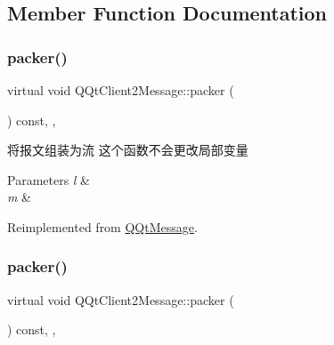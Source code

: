 \subsection{Member Function Documentation}
\mbox{\label{class_q_qt_client2_message_a64b7eaf964f8f2a2ef2c10088fb7e60a}} 
\subsubsection{\texorpdfstring{packer()}{packer()}\hspace{0.1cm}{\footnotesize\ttfamily [1/2]}}
{\footnotesize\ttfamily virtual void Q\+Qt\+Client2\+Message\+::packer (\begin{DoxyParamCaption}\item[{Q\+Byte\+Array \&}]{ }\end{DoxyParamCaption}) const\hspace{0.3cm}{\ttfamily [inline]}, {\ttfamily [override]}, {\ttfamily [virtual]}}



将报文组装为流 这个函数不会更改局部变量 


\begin{DoxyParams}{Parameters}
{\em l} & \\
\hline
{\em m} & \\
\hline
\end{DoxyParams}


Reimplemented from \mbox{\hyperlink{class_q_qt_message_af1885c2c3628495808dca66ee8d72e14}{Q\+Qt\+Message}}.

\mbox{\label{class_q_qt_client2_message_a64b7eaf964f8f2a2ef2c10088fb7e60a}} 
\subsubsection{\texorpdfstring{packer()}{packer()}\hspace{0.1cm}{\footnotesize\ttfamily [2/2]}}
{\footnotesize\ttfamily virtual void Q\+Qt\+Client2\+Message\+::packer (\begin{DoxyParamCaption}\item[{Q\+Byte\+Array \&}]{ }\end{DoxyParamCaption}) const\hspace{0.3cm}{\ttfamily [inline]}, {\ttfamily [override]}, {\ttfamily [virtual]}}



